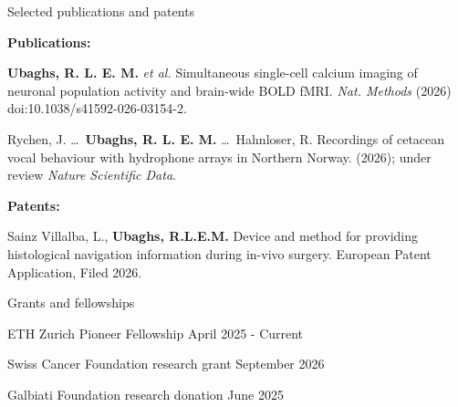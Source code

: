 \documentclass{resume}
\begin{document}
\begin{sections}{Selected publications and patents}

{\bf Publications:}
\begin{resumeitemize}
\item \textbf{Ubaghs, R. L. E. M.} \textit{et al.} Simultaneous single-cell calcium imaging of neuronal population activity and brain-wide BOLD fMRI. \textit{Nat. Methods} (2026) doi:10.1038/s41592-026-03154-2.
\item Rychen, J. \ldots\ \textbf{Ubaghs, R. L. E. M.} \ldots\ Hahnloser, R. Recordings of cetacean vocal behaviour with hydrophone arrays in Northern Norway. (2026); under review \textit{Nature Scientific Data}.
\end{resumeitemize}

{\bf Patents:}
\begin{resumeitemize}
\item Sainz Villalba, L., \textbf{Ubaghs, R.L.E.M.} Device and method for providing histological navigation information during in-vivo surgery. European Patent Application, Filed 2026.
\end{resumeitemize}

\end{sections}

\begin{sections}{Grants and fellowships}

\begin{resumeitemize}
\item {ETH Zurich Pioneer Fellowship} \hfill {April 2025 - Current}
\item {Swiss Cancer Foundation research grant} \hfill {September 2026}
\item {Galbiati Foundation research donation} \hfill {June 2025}
\end{resumeitemize}

\end{sections}
\end{document}
